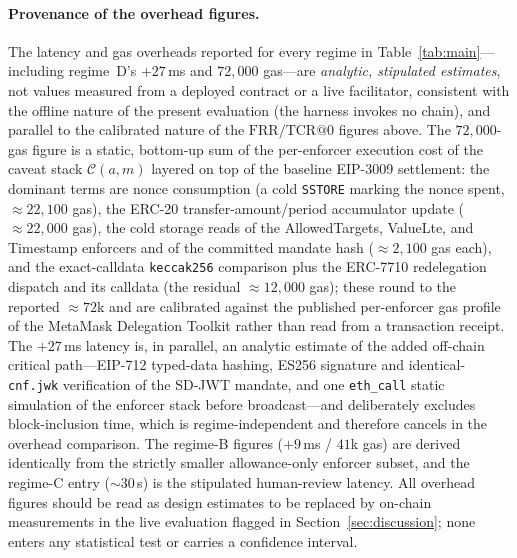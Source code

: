 \documentclass[10pt,twocolumn,letterpaper]{article}
\begin{document}
\paragraph{Provenance of the overhead figures.} The latency and gas overheads reported for every regime in Table~\ref{tab:main}---including regime~D's $+27$\,ms and $72{,}000$ gas---are \emph{analytic, stipulated estimates}, not values measured from a deployed contract or a live facilitator, consistent with the offline nature of the present evaluation (the harness invokes no chain), and parallel to the calibrated nature of the $\mathrm{FRR}/\mathrm{TCR@0}$ figures above. The $72{,}000$-gas figure is a static, bottom-up sum of the per-enforcer execution cost of the caveat stack $\mathcal{C}(a,m)$ layered on top of the baseline EIP-3009 settlement: the dominant terms are nonce consumption (a cold \texttt{SSTORE} marking the nonce spent, $\approx 22{,}100$ gas), the ERC-20 transfer-amount/period accumulator update ($\approx 22{,}000$ gas), the cold storage reads of the AllowedTargets, ValueLte, and Timestamp enforcers and of the committed mandate hash ($\approx 2{,}100$ gas each), and the exact-calldata \texttt{keccak256} comparison plus the ERC-7710 redelegation dispatch and its calldata (the residual $\approx 12{,}000$ gas); these round to the reported $\approx 72$k and are calibrated against the published per-enforcer gas profile of the MetaMask Delegation Toolkit rather than read from a transaction receipt. The $+27$\,ms latency is, in parallel, an analytic estimate of the added off-chain critical path---EIP-712 typed-data hashing, ES256 signature and identical-\texttt{cnf.jwk} verification of the SD-JWT mandate, and one \texttt{eth\_call} static simulation of the enforcer stack before broadcast---and deliberately excludes block-inclusion time, which is regime-independent and therefore cancels in the overhead comparison. The regime-B figures ($+9$\,ms / $41$k gas) are derived identically from the strictly smaller allowance-only enforcer subset, and the regime-C entry ($\sim$$30$\,s) is the stipulated human-review latency. All overhead figures should be read as design estimates to be replaced by on-chain measurements in the live evaluation flagged in Section~\ref{sec:discussion}; none enters any statistical test or carries a confidence interval.
\end{document}

